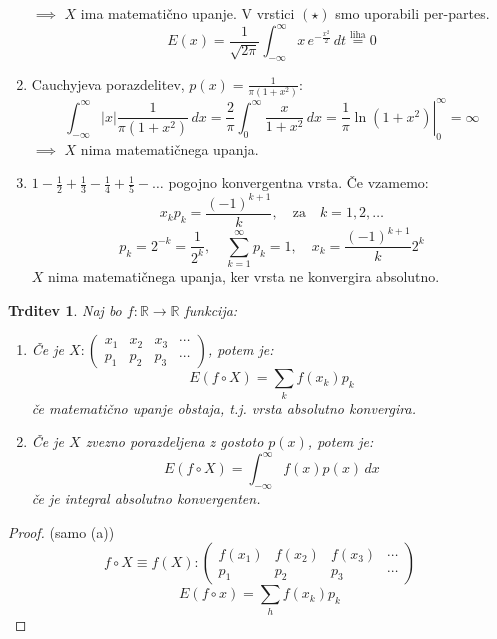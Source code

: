 \documentclass[12pt]{book}
\theoremstyle{definition}
\theoremstyle{plain}
\theoremstyle{plain}
\newtheorem{trditev}{Trditev}
\theoremstyle{plain}
\theoremstyle{remark}
\begin{document}
\begin{zgled}
\begin{enumerate}
        $\implies$ $X$ ima matematično upanje. V vrstici $(\star)$ smo uporabili per-partes.
        $$
        E(x)=\frac{1}{\sqrt{2 \pi}} \int_{-\infty}^{\infty} x \, e^{-\frac{x^2}{2}} \, d t \stackrel{\text{liha}}{=} 0
        $$
        \item Cauchyjeva porazdelitev, $p(x)=\frac{1}{\pi\left(1+x^2\right)}$:
        $$
        \int_{-\infty}^{\infty}|x| \frac{1}{\pi\left(1+x^2\right)} \, d x =\frac{2}{\pi} \int_0^{\infty} \frac{x}{1+x^2} \, d x = \left.\frac{1}{\pi} \ln \left(1+x^2\right)\right|_0 ^{\infty}=\infty
        $$
        $\implies$ $X$ nima matematičnega upanja.
        \item $1-\frac{1}{2}+\frac{1}{3}-\frac{1}{4}+\frac{1}{5}-\ldots$ pogojno konvergentna vrsta. Če vzamemo: 
        $$
        x_k p_k=\frac{(-1)^{k+1}}{k}, \quad \text{za} \quad k=1,2,\ldots
        $$
        $$
        p_k=2^{-k}=\frac{1}{2^k}, \quad \sum_{k=1}^{\infty} p_k=1, \quad x_k=\frac{(-1)^{k+1}}{k} 2^k
        $$
        $X$ nima matematičnega upanja, ker vrsta ne konvergira absolutno. 
    \end{enumerate}
\end{zgled}

\begin{trditev}
    Naj bo $f: \mathbb{R} \rightarrow \mathbb{R}$ funkcija: 
    \begin{enumerate}[label=(\alph*)]
        \item Če je 
            $X:\left(\begin{array}{cccc}
            x_1 & x_2 & x_3 & \cdots \\
            p_1 & p_2 & p_3 & \cdots
            \end{array}\right)$, potem je:
        $$
        E(f \circ X)=\sum_k f\left(x_k\right) p_k
        $$
        če matematično upanje obstaja, t.j. vrsta absolutno konvergira.
        \item Če je $X$ zvezno porazdeljena z gostoto $p(x)$, potem je: 
        $$
        E\left(f \circ X\right)=\int_{-\infty}^{\infty} f(x) p(x) \, d x
        $$
        če je integral absolutno konvergenten.
    \end{enumerate}
\end{trditev}

\begin{proof}(samo (a))
    $$
    f \circ X \equiv f(X):\left(\begin{array}{cccc}
        f\left(x_1\right) & f\left(x_2\right) & f\left(x_3\right) & \cdots \\
        p_1 & p_2 & p_3 & \cdots
        \end{array}\right)
    $$
    $$
    E(f \circ x)=\sum_h f\left(x_k\right) p_k
    $$
\end{proof}
\end{document}
